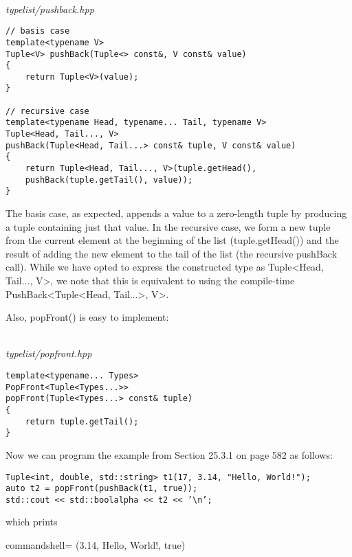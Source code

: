 \hspace*{\fill} \\ %
\noindent
\textit{typelist/pushback.hpp}
\begin{lstlisting}[style=styleCXX]
// basis case
template<typename V>
Tuple<V> pushBack(Tuple<> const&, V const& value)
{
	return Tuple<V>(value);
}

// recursive case
template<typename Head, typename... Tail, typename V>
Tuple<Head, Tail..., V>
pushBack(Tuple<Head, Tail...> const& tuple, V const& value)
{
	return Tuple<Head, Tail..., V>(tuple.getHead(),
	pushBack(tuple.getTail(), value));
}
\end{lstlisting}

The basis case, as expected, appends a value to a zero-length tuple by producing a tuple containing just that value. In the recursive case, we form a new tuple from the current element at the beginning of the list (tuple.getHead()) and the result of adding the new element to the tail of the list (the recursive pushBack call). While we have opted to express the constructed type as Tuple<Head, Tail..., V>, we note that this is equivalent to using the compile-time PushBack<Tuple<Head, Tail...>, V>.

Also, popFront() is easy to implement:

\hspace*{\fill} \\ %
\noindent
\textit{typelist/popfront.hpp}
\begin{lstlisting}[style=styleCXX]
template<typename... Types>
PopFront<Tuple<Types...>>
popFront(Tuple<Types...> const& tuple)
{
	return tuple.getTail();
}
\end{lstlisting}

Now we can program the example from Section 25.3.1 on page 582 as follows:

\begin{lstlisting}[style=styleCXX]
Tuple<int, double, std::string> t1(17, 3.14, "Hello, World!");
auto t2 = popFront(pushBack(t1, true));
std::cout << std::boolalpha << t2 << ’\n’;
\end{lstlisting}

which prints

\begin{tcblisting}{commandshell={}}
(3.14, Hello, World!, true)
\end{tcblisting}


